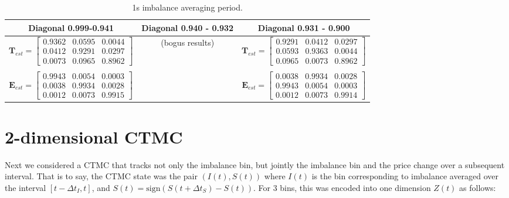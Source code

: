 \documentclass[12pt]{article}
\newcommand\mat[1]{\boldsymbol{#1}}
\begin{document}
\begin{table}[H]
\small
\centering
\caption{1s imbalance averaging period.}%
\vspace*{2.5mm}
\begin{tabularx}{0.98\textwidth}{c|c|c}
\hline
Diagonal 0.999-0.941 & Diagonal 0.940 - 0.932 & Diagonal 0.931 - 0.900 \\
\hline\hline
$\mat{T}_{est} = \begin{bmatrix}
    0.9362 &   0.0595  &  0.0044 \\
    0.0412 &   0.9291  &  0.0297\\
    0.0073 &   0.0965  &  0.8962
\end{bmatrix}$
& 
(bogus results)
& 
$\mat{T}_{est} = \begin{bmatrix}
    0.9291 &   0.0412  &  0.0297\\
    0.0593 &   0.9363  &  0.0044\\
    0.0965 &   0.0073  &  0.8962
\end{bmatrix}$
\\
\phantom{0} & & 
\\
$\mat{E}_{est} = \begin{bmatrix}
    0.9943 &   0.0054  &  0.0003\\
    0.0038 &   0.9934  &  0.0028\\
    0.0012 &   0.0073  &  0.9915
\end{bmatrix}$
&

&
$\mat{E}_{est} = \begin{bmatrix}
    0.0038 &   0.9934   & 0.0028\\
    0.9943 &   0.0054   & 0.0003\\
    0.0012 &   0.0073   & 0.9914
\end{bmatrix}$ \\
\hline 
\end{tabularx}
\end{table}

\section*{2-dimensional CTMC}
Next we considered a CTMC that tracks not only the imbalance bin, but jointly the imbalance bin and the price change over a subsequent interval. That is to say, the CTMC state was the pair $(I(t), S(t))$ where $I(t)$ is the bin corresponding to imbalance averaged over the interval $[t-\Delta t_I, t]$, and $S(t) = \text{sign}(S(t+\Delta t_S)-S(t))$. For 3 bins, this was encoded into one dimension $Z(t)$ as follows:
\end{document}
